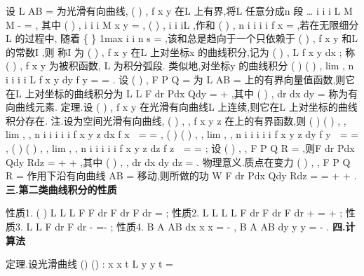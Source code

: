 设
\approx 
L
AB
=
为光滑有向曲线,
(
)
,
f x y 在L 上有界,将L 任意分成n 段
\dots 
i
i
i
L
M
M
-
=
, 
其中
(
)
,
i
i
i
M
x y
=
,
(
)
,
i
i
iL
\psi \eta 
\forall 
\in 
,作和
(
)
,
n
i
i
i
i
f
x
\psi \eta 
=
\Delta 
\sum 
,若在无限细分L 的过程中, 
随着
\{
\}
1max
i
i n
s
\lambda 
\le \le 
=
\Delta 
\to 
,该和总是趋向于一个只依赖于
(
)
,
f x y 和L 的常数I ,则 
称I 为
(
)
,
f x y 在L 上\textcolor{lyred}{对坐标x 的曲线积分},记为
(
)
,
L
f x y dx
\int 
; 
称
(
)
,
f x y 为\textcolor{lyred}{被积函数}, L 为\textcolor{lyred}{积分弧段}. 
类似地,\textcolor{lyred}{对坐标y 的曲线积分}
(
)
(
)
,
lim
,
n
i
i
i
i
L
f
x y dy
f
y
\lambda 
\psi \eta 
\to 
=
=
\Delta 
\sum 
\int 
. 
设
(
)
,
F
P Q
=
\rho 
为
\approx 
L
AB
=
上的有界向量值函数,则它在L 上\textcolor{lyred}{对坐标的曲线积分}为 
L
L
F dr
Pdx
Qdy
\cdots 
=
+
\int 
\int 
\rho 
\rho 
,其中
(
)
,
dr
dx dy
=
\rho 
称为\textcolor{lyred}{有向曲线元素}. 
\textcolor{lyred}{定理}.设
(
)
,
f x y 在光滑有向曲线L 上连续,则它在L 上对坐标的曲线积分存在. 
\textcolor{lyred}{注}.设\Gamma 为空间光滑有向曲线,
(
)
, ,
f x y z 在\Gamma 上的有界函数,则 
(
)
(
)
, ,
lim
,
,
n
i
i
i
i
i
f x y z dx
f
x
\lambda 
\psi \eta 
\to 
=
\Gamma 
=
\Delta 
\sum 
\int 
,
(
)
(
)
, ,
lim
,
,
n
i
i
i
i
i
f x y z dy
f
y
\lambda 
\psi \eta 
\to 
=
\Gamma 
=
\Delta 
\sum 
\int 
, 
(
)
(
)
, ,
lim
,
,
n
i
i
i
i
i
f x y z dz
f
z
\lambda 
\psi \eta 
\to 
=
\Gamma 
=
\Delta 
\sum 
\int 
; 
设
(
)
,
,
F
P Q R
=
\rho 
,则F dr
Pdx
Qdy
Rdz
\Gamma 
\Gamma 
\cdots 
=
+
+
\int 
\int 
\rho 
\rho 
,其中
(
)
,
,
dr
dx dy dz
=
\rho 
. 
\textcolor{lyred}{物理意义}.质点在变力
(
)
,
,
F
P Q R
=
\rho 
作用下沿有向曲线
\approx 
AB
\Gamma =
移动,则所做的功 
W
F dr
Pdx
Qdy
Rdz
\Gamma 
\Gamma 
=
\cdots 
=
+
+
\int 
\int 
\rho 
\rho 
. 
\vspace{4pt}
{\bfseries \textcolor{lyred}{三.第二类曲线积分的性质}}

\textcolor{lyred}{性质1}. (
)
L
L
L
F
F
dr
F dr
F
dr
\alpha 
\beta 
\alpha 
\beta 
\pm 
\cdots 
=
\cdots 
\pm 
\cdots 
\int 
\int 
\int 
\rho 
\rho 
\rho 
\rho 
\rho 
\rho 
\rho ; 
\textcolor{lyred}{性质2}.
L
L
L
L
F dr
F dr
F dr
+
\cdots 
=
\cdots 
+
\cdots 
\int 
\int 
\int 
\rho 
\rho 
\rho 
\rho 
\rho 
\rho ; 
\textcolor{lyred}{性质3}.
L
L
F dr
F dr
-
\cdots 
=-
\cdots 
\int 
\int 
\rho 
\rho 
\rho 
\rho ; 
\textcolor{lyred}{性质4}.
\approx 
B
A
AB
dx
x
x
\cdots 
=
-
\int 
,
\approx 
B
A
AB
dy
y
y
\cdots 
=
-
\int 
. 
\vspace{4pt}
{\bfseries \textcolor{lyred}{四.计算法}}

\textcolor{lyred}{定理}.设光滑曲线
()
()
: x
x t
L
y
y t
=


